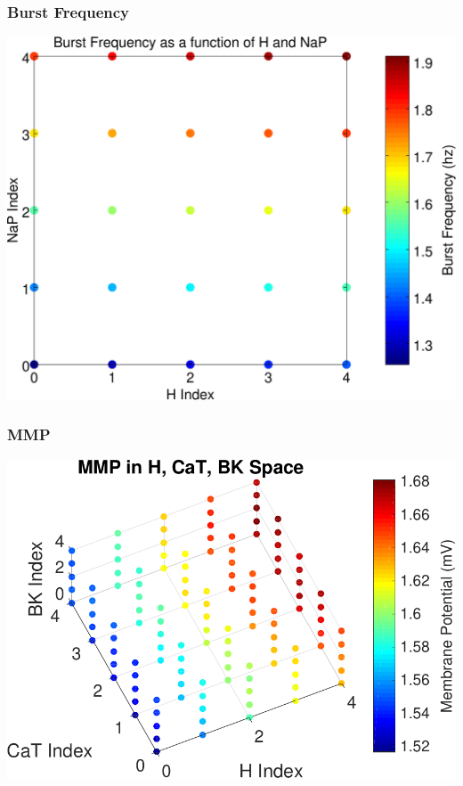 \documentclass{beamer}
\theoremstyle{plain}
\theoremstyle{definition}
\begin{document}
\begin{frame}\frametitle{Burst Frequency}
  \begin{center}
    \includegraphics[scale=.5]{BurstFrequencyScatter.pdf}%
  \end{center}
\end{frame}

\begin{frame}\frametitle{MMP}
  \begin{center}
    \includegraphics[scale=.7]{MMPScatter.pdf}%
  \end{center}
\end{frame}
\end{document}
